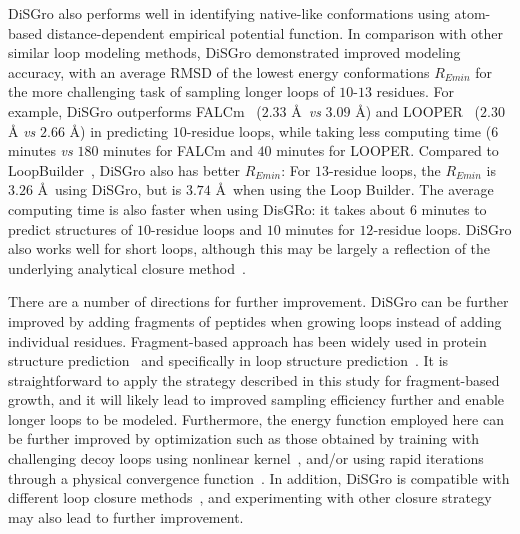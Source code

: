 {\sc DiSGro} also performs well in identifying native-like
conformations using atom-based distance-dependent empirical
potential function. In comparison with other similar loop modeling
methods, {\sc DiSGro} demonstrated improved modeling accuracy, with
an average RMSD of the lowest energy conformations $R_{Emin}$ for
the more challenging task of sampling longer loops of $10$-$13$
residues. For example, {\sc DiSGro} outperforms FALCm~\cite{lee2010}
($2.33$ \r{A}\ {\it vs}\/ $3.09$ \r{A}) and
LOOPER~\cite{spassov2008} ($2.30$ \r{A} {\it vs}\/ $2.66$ \r{A}) in
predicting $10$-residue loops, while taking less computing time ($6$
minutes {\it vs\/} $180$ minutes for FALCm and $40$ minutes for
LOOPER. Compared to LoopBuilder~\cite{soto2008}, {\sc DiSGro} also
has better $R_{Emin}$: For $13$-residue loops, the $R_{Emin}$ is
$3.26$ \r{A}\ using {\sc DiSGro}, but is $3.74$ \r{A}\ when using
the Loop Builder. The average computing time is also faster when
using {\sc DisGRo}: it takes about $6$ minutes to predict structures
of $10$-residue loops and $10$ minutes for $12$-residue loops. {\sc
DiSGro} also works well for short loops, although this may be
largely a reflection of the underlying analytical closure
method~\cite{coutsias2004}.

There are a number of directions for further improvement. {\sc
DiSGro} can be further improved by adding fragments of peptides when
growing loops instead of adding individual residues. Fragment-based
approach has been widely used in protein structure
prediction~\cite{simons1997,rohl2004,sheffler2010,leaver2011} and
specifically in loop structure prediction~\cite{mandell2009}. It is
straightforward to apply the strategy described in this study for
fragment-based growth, and it will likely lead to improved sampling
efficiency further and enable longer loops to be modeled.
Furthermore, the energy function employed here can be further
improved by optimization such as those obtained by training with
challenging decoy loops using nonlinear kernel~\cite{hu2004}, and/or
using rapid iterations through a physical convergence
function~\cite{thomas1996,huang2011}. In addition, {\sc DiSGro} is
compatible with different loop closure
methods~\cite{canutescu2003,coutsias2004,lee2010}, and experimenting
with other closure strategy may also lead to further improvement.

